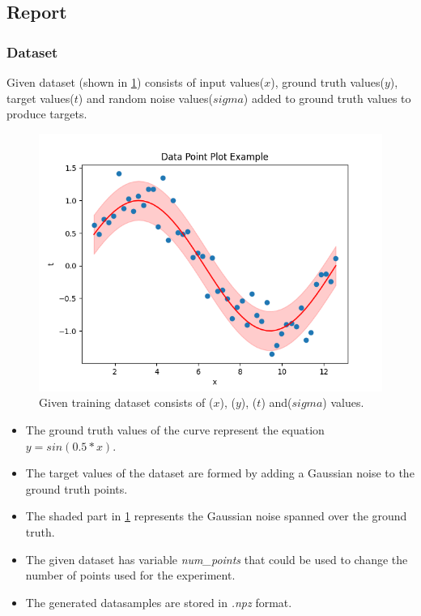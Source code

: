 \documentclass[12pt,twoside,a4paper]{article}
\begin{document}
\pagebreak
\subsection{Report}
\subsubsection{Dataset}
Given dataset (shown in \ref{fig: DATASET}) consists of input values($x$), ground truth values($y$), target values($t$) and random noise values($sigma$) added to ground truth values to produce targets.
\begin{figure}[H]
    \centering
    \includegraphics{results/gt_data.png}
    \caption{Given training dataset consists of ($x$), ($y$), ($t$) and($sigma$) values.}
    \label{fig: DATASET}
\end{figure}
\begin{itemize}
    \item The ground truth values of the curve represent the equation $y = sin(0.5*x)$.
    \item The target values of the dataset are formed by adding a Gaussian noise to the ground truth points.
    \item The shaded part in \ref{fig: DATASET} represents the Gaussian noise spanned over the ground truth.
    \item The given dataset has variable \textit{num\_points} that could be used to change the number of points used for the experiment.
    \item The generated datasamples are stored in \textit{.npz} format.
\end{itemize}
\pagebreak
\end{document}

